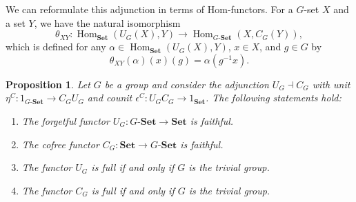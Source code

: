 \documentclass[10pt,a4paper]{amsart}
\newtheorem{proposition}{Proposition}
\begin{document}
We can reformulate this adjunction in terms of Hom-functors. 
For a $G$-set $X$ and a set $Y$, we have the natural isomorphism
\[
\theta_{XY} \colon \operatorname{Hom}_{\mathbf{Set}}(U_G(X), Y) 
\longrightarrow \operatorname{Hom}_{G\text{-}\mathbf{Set}}(X, C_G(Y)),
\]
which is defined for any $\alpha \in \operatorname{Hom}_{\mathbf{Set}}(U_G(X), Y)$, 
$x \in X$, and $g \in G$ by
\[
\theta_{XY}(\alpha)(x)(g) = \alpha(g^{-1}x).
\]

\begin{proposition}\label{prop:cofree_faithfulness}
Let $G$ be a group and consider the adjunction $U_G \dashv C_G$ with unit $\eta^C \colon 1_{G\text{-}\mathbf{Set}} \longrightarrow C_G U_G$ and counit $\epsilon^C \colon U_G C_G \longrightarrow 1_{\mathbf{Set}}$. The following statements hold:
\begin{enumerate}
\item The forgetful functor $U_G \colon G\text{-}\mathbf{Set} \longrightarrow \mathbf{Set}$ is faithful.
\item The cofree functor $C_G \colon \mathbf{Set} \longrightarrow G\text{-}\mathbf{Set}$ is faithful.
\item The functor $U_G$ is full if and only if $G$ is the trivial group.
\item The functor $C_G$ is full if and only if $G$ is the trivial group.
\end{enumerate}
\end{proposition}
\end{document}
